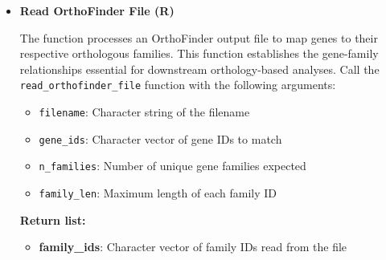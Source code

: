 \begin{enumerate}
\begin{itemize}
                  \textbf{Return list:}
                  \begin{itemize}
                    \item \textbf{expression\_vectors}: Numeric matrix of dimensions (n\_samples
                          × n\_genes)
                          
                    \item \textbf{ierr}: Integer error code (0 if successful)
                  \end{itemize}
                  
                  \begin{lstlisting}[language=R, caption={R Read Expression Vectors}]
read_expression_vectors(file_list, gene_ids, n_header_rows, gene_col, 
    value_cols, n_samples, delimiter = "\t")
                  \end{lstlisting}
                  
            \item \textbf{Read OrthoFinder File (R)}
                  
                  The function processes an OrthoFinder output file to map genes to their respective
                  orthologous families. This function establishes the gene-family
                  relationships essential for downstream orthology-based analyses. Call the \texttt{read\_orthofinder\_file}
                  function with the following arguments:
                  
                  \begin{itemize}
                    \item \texttt{filename}: Character string of the filename
                          
                    \item \texttt{gene\_ids}: Character vector of gene IDs to match
                          
                    \item \texttt{n\_families}: Number of unique gene families expected
                          
                    \item \texttt{family\_len}: Maximum length of each family ID
                  \end{itemize}
                  
                  \textbf{Return list:}
                  \begin{itemize}
                    \item \textbf{family\_ids}: Character vector of family IDs read from the
                          file
                          

\end{itemize}
\end{itemize}
\end{enumerate}
